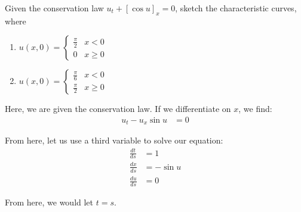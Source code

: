 \item Given the conservation law $u_t + [\cos u]_x = 0$, sketch the characteristic curves, where
%
\begin{enumerate}
  \item
  $
  \displaystyle
  u(x, 0) =
  \begin{cases}
    \frac{\pi}{2} & x < 0\\
    0 & x \geq 0
  \end{cases}
  $

  \item
  $
  \displaystyle
  u(x, 0) =
  \begin{cases}
    \frac{\pi}{6} & x < 0\\
    \frac{\pi}{2} & x \geq 0
  \end{cases}
  $
\end{enumerate}

\bigbreak

Here, we are given the conservation law. If we differentiate on $x$, we find:
%
\begin{align}
  u_t - u_x \sin u & = 0
\end{align}

  From here, let us use a third variable to solve our equation:
  \begin{align}
    \frac{dt}{ds} & = 1\\
    \frac{dx}{ds} & = -\sin u\\
    \frac{du}{ds} & = 0
  \end{align}

  From here, we would let $t = s$.

